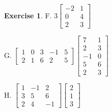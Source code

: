 \documentclass[
]{book}
\theoremstyle{definition}
\theoremstyle{definition}
\theoremstyle{definition}
\newtheorem{exercise}{Exercise}[chapter]
\theoremstyle{definition}
\theoremstyle{remark}
\begin{document}
\begin{exercise}
F. \(3 \begin{bmatrix} -2 & 1 \\ 0 & 4 \\ 2 & 3 \end{bmatrix}\)

G. \(\begin{bmatrix} 1 & 0 & 3 & -1 & 5 \\ 2 & 1 & 6 & 2 & 5 \end{bmatrix} \begin{bmatrix} 7 & 1 \\ 2 & 3 \\ -1 & 0 \\ 5 & 6 \\ 2 & 3 \end{bmatrix}\)

H. \(\begin{bmatrix} 1 & -1 & 2 \\ 3 & 5 & 6 \\ 2 & 4 & -1 \end{bmatrix}
\begin{bmatrix} 2 \\ 1 \\ 3 \end{bmatrix}\)
\end{exercise}
\end{document}
